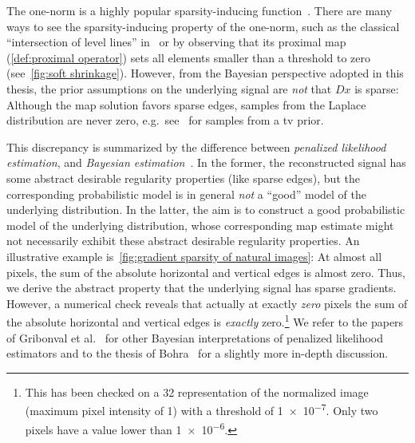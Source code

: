 The one-norm is a highly popular sparsity-inducing function~\cite{Daubechies2004,unser_representer_2016}.
There are many ways to see the sparsity-inducing property of the one-norm, such as the classical \enquote{intersection of level lines} in~\cite[figure 3.11]{Hastie2009} or by observing that its proximal map (\cref{def:proximal operator}) sets all elements smaller than a threshold to zero (see~\cref{fig:soft shrinkage}).
However, from the Bayesian perspective adopted in this thesis, the prior assumptions on the underlying signal are \emph{not} that \( Dx \) is sparse:
Although the \gls{map} solution favors sparse edges, samples from the Laplace distribution are never zero, e.g.\ see~\cite[fig. 1]{adler_deep_2018} for samples from a \gls{tv} prior.

This discrepancy is summarized by the difference between \emph{penalized likelihood estimation}, and \emph{Bayesian estimation}~\cite{bohra_phdthesis,gribonval_penalized_2011}.
In the former, the reconstructed signal has some abstract desirable regularity properties (like sparse edges), but the corresponding probabilistic model is in general \emph{not} a \enquote{good} model of the underlying distribution.
In the latter, the aim is to construct a good probabilistic model of the underlying distribution, whose corresponding \gls{map} estimate might not necessarily exhibit these abstract desirable regularity properties.
An illustrative example is~\cref{fig:gradient sparsity of natural images}: At almost all pixels, the sum of the absolute horizontal and vertical edges is almost zero.
Thus, we derive the abstract property that the underlying signal has sparse gradients.
However, a numerical check reveals that actually at exactly \emph{zero} pixels the sum of the absolute horizontal and vertical edges is \emph{exactly} zero.\footnote{%
	This has been checked on a \qty{32}{\bit} representation of the normalized image (maximum pixel intensity of \num{1}) with a threshold of \num{1e-7}.
	Only two pixels have a value lower than \num{1e-6}.
}
We refer to the papers of Gribonval et al.~\cite{gribonval_penalized_2011,gribonval_compressible_2012} for other Bayesian interpretations of penalized likelihood estimators and to the thesis of Bohra~\cite[section 2.2]{bohra_phdthesis} for a slightly more in-depth discussion.

